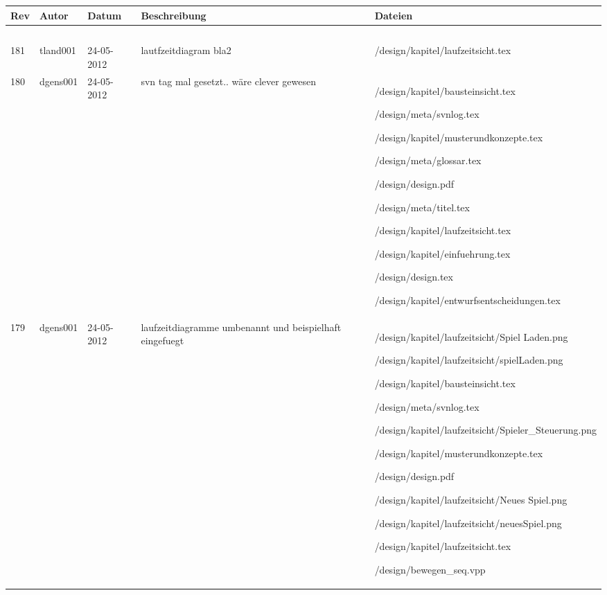 
  \begin{longtable}{l l l p{80px} p{200px}}
	  \textbf{Rev} & \textbf{Autor}  &\textbf{Datum} & \textbf{Beschreibung} & \textbf{Dateien}\\
	  \hline
	              &      \           &       \       &            \          &        \\
	  181 &
		  tland001
		  &
		  24-05-2012
		  &
		  lautfzeitdiagram bla2
		  & \strut
		  /design/kapitel/laufzeitsicht.tex \par  \strut \\
	  180 &
		  dgens001
		  &
		  24-05-2012
		  &
		  svn tag mal gesetzt.. wäre clever gewesen
		  & \strut
		  /design/kapitel/bausteinsicht.tex \par /design/meta/svnlog.tex \par /design/kapitel/musterundkonzepte.tex \par /design/meta/glossar.tex \par /design/design.pdf \par /design/meta/titel.tex \par /design/kapitel/laufzeitsicht.tex \par /design/kapitel/einfuehrung.tex \par /design/design.tex \par /design/kapitel/entwurfsentscheidungen.tex \par  \strut \\
	  179 &
		  dgens001
		  &
		  24-05-2012
		  &
		  laufzeitdiagramme umbenannt und beispielhaft eingefuegt
		  & \strut
		  /design/kapitel/laufzeitsicht/Spiel Laden.png \par /design/kapitel/laufzeitsicht/spielLaden.png \par /design/kapitel/bausteinsicht.tex \par /design/meta/svnlog.tex \par /design/kapitel/laufzeitsicht/Spieler\_Steuerung.png \par /design/kapitel/musterundkonzepte.tex \par /design/design.pdf \par /design/kapitel/laufzeitsicht/Neues Spiel.png \par /design/kapitel/laufzeitsicht/neuesSpiel.png \par /design/kapitel/laufzeitsicht.tex \par /design/bewegen\_seq.vpp \par  \strut \\
	  
  \end{longtable}
  